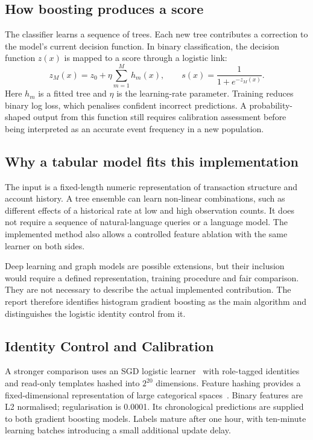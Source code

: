 \documentclass[12pt,a4paper,oneside]{report}
\begin{document}
\subsection{How boosting produces a score}
The classifier learns a sequence of trees. Each new tree contributes a correction to the model's current decision function. In binary classification, the decision function $z(x)$ is mapped to a score through a logistic link:
\begin{equation}z_M(x)=z_0+\eta\sum_{m=1}^{M}h_m(x),\qquad s(x)=\frac{1}{1+e^{-z_M(x)}}.\end{equation}
Here $h_m$ is a fitted tree and $\eta$ is the learning-rate parameter. Training reduces binary log loss, which penalises confident incorrect predictions. A probability-shaped output from this function still requires calibration assessment before being interpreted as an accurate event frequency in a new population.
\subsection{Why a tabular model fits this implementation}
The input is a fixed-length numeric representation of transaction structure and account history. A tree ensemble can learn non-linear combinations, such as different effects of a historical rate at low and high observation counts. It does not require a sequence of natural-language queries or a language model. The implemented method also allows a controlled feature ablation with the same learner on both sides.

Deep learning and graph models are possible extensions, but their inclusion would require a defined representation, training procedure and fair comparison. They are not necessary to describe the actual implemented contribution. The report therefore identifies histogram gradient boosting as the main algorithm and distinguishes the logistic identity control from it.

\subsection{Identity Control and Calibration}
A stronger comparison uses an SGD logistic learner~\cite{sgd} with role-tagged identities and read-only templates hashed into $2^{20}$ dimensions. Feature hashing provides a fixed-dimensional representation of large categorical spaces~\cite{hashing}. Binary features are L2 normalised; regularisation is 0.0001. Its chronological predictions are supplied to both gradient boosting models. Labels mature after one hour, with ten-minute learning batches introducing a small additional update delay.
\end{document}
